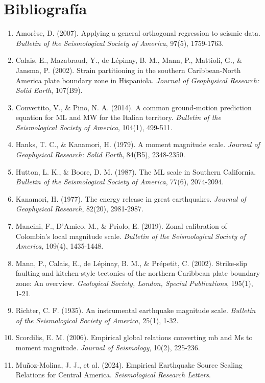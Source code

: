 \documentclass[12pt,a4paper]{article}
\begin{document}
\clearpage
\section{Bibliografía}
\begin{enumerate}
    \item Amorèse, D. (2007). Applying a general orthogonal regression to seismic data. \textit{Bulletin of the Seismological Society of America}, 97(5), 1759-1763.
    \item Calais, E., Mazabraud, Y., de Lépinay, B. M., Mann, P., Mattioli, G., \& Jansma, P. (2002). Strain partitioning in the southern Caribbean-North America plate boundary zone in Hispaniola. \textit{Journal of Geophysical Research: Solid Earth}, 107(B9).
    \item Convertito, V., \& Pino, N. A. (2014). A common ground-motion prediction equation for ML and MW for the Italian territory. \textit{Bulletin of the Seismological Society of America}, 104(1), 499-511.
    \item Hanks, T. C., \& Kanamori, H. (1979). A moment magnitude scale. \textit{Journal of Geophysical Research: Solid Earth}, 84(B5), 2348-2350.
    \item Hutton, L. K., \& Boore, D. M. (1987). The ML scale in Southern California. \textit{Bulletin of the Seismological Society of America}, 77(6), 2074-2094.
    \item Kanamori, H. (1977). The energy release in great earthquakes. \textit{Journal of Geophysical Research}, 82(20), 2981-2987.
    \item Mancini, F., D'Amico, M., \& Priolo, E. (2019). Zonal calibration of Colombia's local magnitude scale. \textit{Bulletin of the Seismological Society of America}, 109(4), 1435-1448.
    \item Mann, P., Calais, E., de Lépinay, B. M., \& Prépetit, C. (2002). Strike-slip faulting and kitchen-style tectonics of the northern Caribbean plate boundary zone: An overview. \textit{Geological Society, London, Special Publications}, 195(1), 1-21.
    \item Richter, C. F. (1935). An instrumental earthquake magnitude scale. \textit{Bulletin of the Seismological Society of America}, 25(1), 1-32.
    \item Scordilis, E. M. (2006). Empirical global relations converting mb and Ms to moment magnitude. \textit{Journal of Seismology}, 10(2), 225-236.
    \item Muñoz-Molina, J. J., et al. (2024). Empirical Earthquake Source Scaling Relations for Central America. \textit{Seismological Research Letters}.

\end{enumerate}
\end{document}

